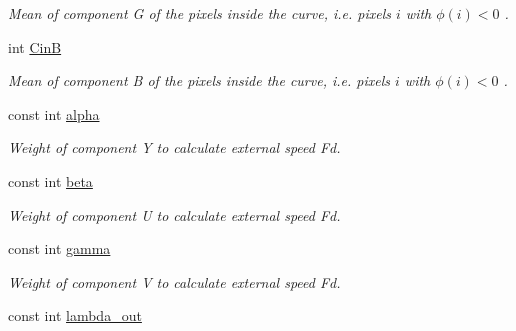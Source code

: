 \begin{DoxyCompactItemize}
\begin{DoxyCompactList}\small\item\em Mean of component {\itshape G} of the pixels inside the curve, i.\-e. pixels $i$ with $\phi \left( i\right) <0$ . \end{DoxyCompactList}\item 
\hypertarget{classofeli_1_1_a_cwithout_edges_y_u_v_a72114f3223a47ba7d688f0c755aa4ae8}{int \hyperlink{classofeli_1_1_a_cwithout_edges_y_u_v_a72114f3223a47ba7d688f0c755aa4ae8}{Cin\-B}}\label{classofeli_1_1_a_cwithout_edges_y_u_v_a72114f3223a47ba7d688f0c755aa4ae8}

\begin{DoxyCompactList}\small\item\em Mean of component {\itshape B} of the pixels inside the curve, i.\-e. pixels $i$ with $\phi \left( i\right) <0$ . \end{DoxyCompactList}\item 
\hypertarget{classofeli_1_1_a_cwithout_edges_y_u_v_a613340fb017ff19af8510c9d72c9663b}{const int \hyperlink{classofeli_1_1_a_cwithout_edges_y_u_v_a613340fb017ff19af8510c9d72c9663b}{alpha}}\label{classofeli_1_1_a_cwithout_edges_y_u_v_a613340fb017ff19af8510c9d72c9663b}

\begin{DoxyCompactList}\small\item\em Weight of component {\itshape Y} to calculate external speed {\itshape Fd}. \end{DoxyCompactList}\item 
\hypertarget{classofeli_1_1_a_cwithout_edges_y_u_v_ae341898fb9f83bf41a731e1ada24cf0a}{const int \hyperlink{classofeli_1_1_a_cwithout_edges_y_u_v_ae341898fb9f83bf41a731e1ada24cf0a}{beta}}\label{classofeli_1_1_a_cwithout_edges_y_u_v_ae341898fb9f83bf41a731e1ada24cf0a}

\begin{DoxyCompactList}\small\item\em Weight of component {\itshape U} to calculate external speed {\itshape Fd}. \end{DoxyCompactList}\item 
\hypertarget{classofeli_1_1_a_cwithout_edges_y_u_v_a249bf1ba21819ddb9f63f0ceef8a97b2}{const int \hyperlink{classofeli_1_1_a_cwithout_edges_y_u_v_a249bf1ba21819ddb9f63f0ceef8a97b2}{gamma}}\label{classofeli_1_1_a_cwithout_edges_y_u_v_a249bf1ba21819ddb9f63f0ceef8a97b2}

\begin{DoxyCompactList}\small\item\em Weight of component {\itshape V} to calculate external speed {\itshape Fd}. \end{DoxyCompactList}\item 
\hypertarget{classofeli_1_1_a_cwithout_edges_y_u_v_a7e638b979761b49ad1aecc50a194dad0}{const int \hyperlink{classofeli_1_1_a_cwithout_edges_y_u_v_a7e638b979761b49ad1aecc50a194dad0}{lambda\-\_\-out}}\label{classofeli_1_1_a_cwithout_edges_y_u_v_a7e638b979761b49ad1aecc50a194dad0}


\end{DoxyCompactItemize}
